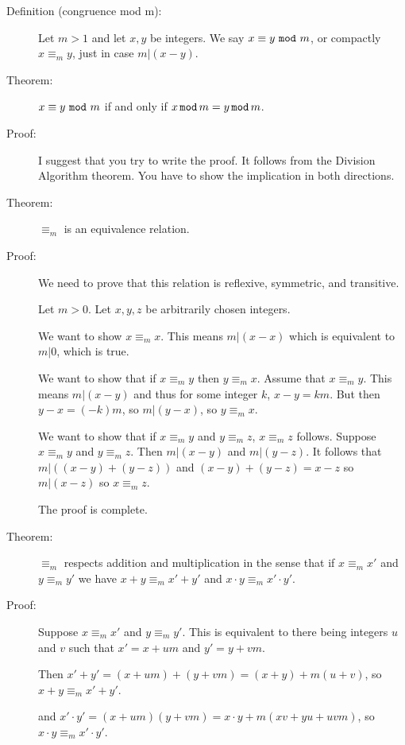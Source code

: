 \documentclass[12pt]{article}
\begin{document}
\begin{description}

\item[Definition (congruence mod m):]  Let $m>1$ and let $x,y$ be integers.  We say $x \equiv y \,\,{\tt mod}\, \, m$, or compactly
$x \equiv_m y$, just in case $m|(x-y)$.

\item[Theorem:]  $x \equiv y \,\,{\tt mod}\, \, m$ if and only if $x \,{\tt mod}\, m = y \,{\tt mod}\, m$.

\item[Proof:]  I suggest that you try to write the proof.  It follows from the Division Algorithm theorem.  You have to show the implication in both directions.

\item[Theorem:]  $\equiv_m$ is an equivalence relation.

\item[Proof:]  We need to prove that this relation is reflexive, symmetric, and transitive.

Let $m>0$.  Let $x,y,z$ be arbitrarily chosen integers.

We want to show $x \equiv_m x$.  This means $m|(x-x)$ which is equivalent to $m|0$, which is true.

We want to show that if $x \equiv_m y$ then $y \equiv_m x$.  Assume that $x \equiv_m y$.  This means $m|(x-y)$ and thus
for some integer $k$, $x-y=km$.  But then $y-x=(-k)m$, so $m|(y-x)$, so $y \equiv_m x$. 

We want to show that if $x \equiv_m y$  and $y \equiv_m z$, $x \equiv_m z$ follows.  Suppose $x \equiv_m y$  and $y \equiv_m z$.
Then $m|(x-y)$ and $m|(y-z)$.  It follows that $m|((x-y)+(y-z))$ and $(x-y)+(y-z)=x-z$ so $m|(x-z)$ so $x \equiv_m z$.

The proof is complete.

\item[Theorem:]  $\equiv_m$ respects addition and multiplication in the sense that if \newline $x\equiv_m x'$ and $y\equiv_m y'$ we have
$x+y \equiv_m x'+y'$ and $x\cdot y \equiv_m x' \cdot y'$.

\item[Proof:]  Suppose $x\equiv_m x'$ and $y\equiv_m y'$.  This is equivalent to there being integers $u$ and $v$ such that $x'=x+um$ and $y' = y+vm$.

Then $x'+y' = (x+um)+(y+vm) = (x+y) + m(u+v)$, so $x+y \equiv_m x'+y'$.

and $x'\cdot y' = (x+um)(y+vm) = x\cdot y + m(xv + yu + uvm)$, so $x\cdot y \equiv_m x' \cdot y'$.


\end{description}
\end{document}
